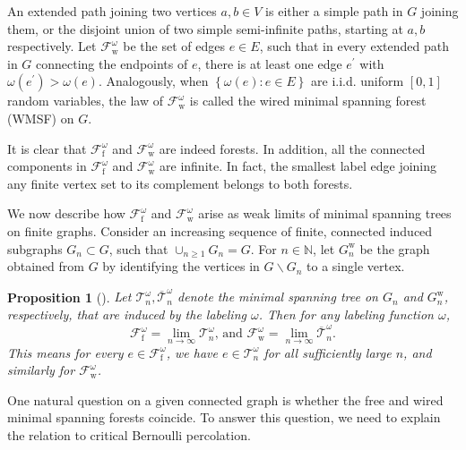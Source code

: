\documentclass[12pt, twoside,a4paper,reqno]{amsart}
\theoremstyle{plain}
\newtheorem{proposition}[theorem]{Proposition}
\theoremstyle{remark}
\theoremstyle{definition}
\renewcommand{\bar}{\overline}
\begin{document}
An extended path joining two vertices $a,b\in V$ is either a simple path in $%
G$ joining them, or the disjoint union of two simple semi-infinite paths,
starting at $a,b$ respectively. Let $\mathcal{F}_{\mathrm w}^{\omega }$ be the set
of edges $e\in E$, such that in every extended path in $G$ connecting the
endpoints of $e$, there is at least one edge $e^{\prime }$ with $\omega
\left( e^{\prime }\right) >\omega \left( e\right) $. Analogously, when $%
\left\{ \omega \left( e\right) :e\in E\right\} $ are i.i.d. uniform $\left[
0,1\right] $ random variables, the law of $\mathcal{F}_{\mathrm w}^{\omega }$ is
called the wired minimal spanning forest (WMSF) on $G$.

It is clear that $\mathcal{F}_{\mathrm f}^{\omega }$ and $\mathcal{F}_{\mathrm w}^{\omega }$
are indeed forests. In addition, all the connected components in $\mathcal{F%
}_{\mathrm f}^{\omega }$ and $\mathcal{F}_{\mathrm w}^{\omega }$ are infinite. In fact, the
smallest label edge joining any finite vertex set to its complement belongs to
both forests.

We now describe how $\mathcal{F}_{\mathrm f}^{\omega }$ and $\mathcal{F}_{\mathrm w}^{\omega
}$ arise as weak limits of minimal spanning trees on finite graphs. Consider
an increasing sequence of finite, connected induced subgraphs $G_{n}\subset
G $, such that $\cup _{n\geq 1}G_{n}=G$. For $n\in \mathbb{N}$, let $%
G_{n}^{\mathrm w}$ be the graph obtained from $G$ by identifying the vertices in $%
G\backslash G_{n}$ to a single vertex.

\begin{proposition}[\protect\cite{Alex}\cite{LPS}]
Let $\mathcal{T}_{n}^{\omega },\bar{\mathcal T}_{n}^{\omega }
$ denote the minimal spanning tree on $G_{n}$ and $G_{n}^{\mathrm w}$, respectively,
that are induced by the labeling $\omega $. Then for any labeling function $\omega$, \[ \mathcal{F}_{\mathrm f}^{\omega
}=\lim_{n\rightarrow \infty }\mathcal{T}_{n}^{\omega }\text{, and } \mathcal{F}
_{\mathrm w}^{\omega }=\lim_{n\rightarrow \infty }\bar{\mathcal T}_{n}^{\omega }. \]
This means for every $e \in \mathcal{F}_{\mathrm f}^{\omega}$, we have $e \in \mathcal{T}_{n}^{\omega }$
for all sufficiently large $n$, and similarly for $\mathcal{F}_{\mathrm w}^{\omega}$.
\end{proposition}

One natural question on a given connected graph is whether the free and
wired minimal spanning forests coincide. To answer this question, we need to
explain the relation to critical Bernoulli percolation.
\end{document}
